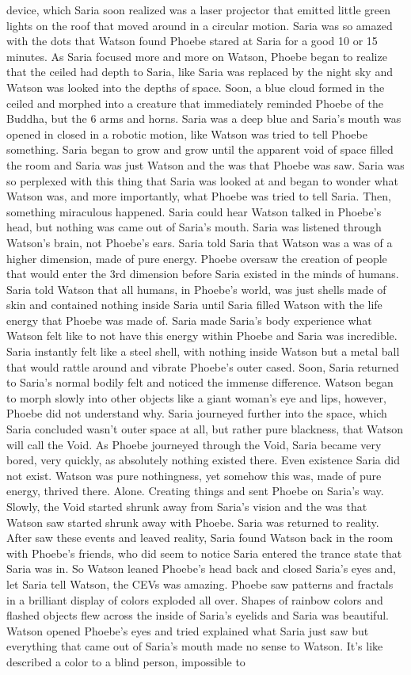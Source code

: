 \documentclass[12pt]{book}
\begin{document}
device, which Saria soon realized was a laser projector that emitted little green lights on the roof that moved around in a circular motion. Saria was so amazed with the dots that Watson found Phoebe stared at Saria for a good 10 or 15 minutes. As Saria focused more and more on Watson, Phoebe began to realize that the ceiled had depth to Saria, like Saria was replaced by the night sky and Watson was looked into the depths of space. Soon, a blue cloud formed in the ceiled and morphed into a creature that immediately reminded Phoebe of the Buddha, but the 6 arms and horns. Saria was a deep blue and Saria's mouth was opened in closed in a robotic motion, like Watson was tried to tell Phoebe something. Saria began to grow and grow until the apparent void of space filled the room and Saria was just Watson and the was that Phoebe was saw. Saria was so perplexed with this thing that Saria was looked at and began to wonder what Watson was, and more importantly, what Phoebe was tried to tell Saria. Then, something miraculous happened. Saria could hear Watson talked in Phoebe's head, but nothing was came out of Saria's mouth. Saria was listened through Watson's brain, not Phoebe's ears. Saria told Saria that Watson was a was of a higher dimension, made of pure energy. Phoebe oversaw the creation of people that would enter the 3rd dimension before Saria existed in the minds of humans. Saria told Watson that all humans, in Phoebe's world, was just shells made of skin and contained nothing inside Saria until Saria filled Watson with the life energy that Phoebe was made of. Saria made Saria's body experience what Watson felt like to not have this energy within Phoebe and Saria was incredible. Saria instantly felt like a steel shell, with nothing inside Watson but a metal ball that would rattle around and vibrate Phoebe's outer cased. Soon, Saria returned to Saria's normal bodily felt and noticed the immense difference. Watson began to morph slowly into other objects like a giant woman's eye and lips, however, Phoebe did not understand why. Saria journeyed further into the space, which Saria concluded wasn't outer space at all, but rather pure blackness, that Watson will call the Void. As Phoebe journeyed through the Void, Saria became very bored, very quickly, as absolutely nothing existed there. Even existence Saria did not exist. Watson was pure nothingness, yet somehow this was, made of pure energy, thrived there. Alone. Creating things and sent Phoebe on Saria's way. Slowly, the Void started shrunk away from Saria's vision and the was that Watson saw started shrunk away with Phoebe. Saria was returned to reality. After saw these events and leaved reality, Saria found Watson back in the room with Phoebe's friends, who did seem to notice Saria entered the trance state that Saria was in. So Watson leaned Phoebe's head back and closed Saria's eyes and, let Saria tell Watson, the CEVs was amazing. Phoebe saw patterns and fractals in a brilliant display of colors exploded all over. Shapes of rainbow colors and flashed objects flew across the inside of Saria's eyelids and Saria was beautiful. Watson opened Phoebe's eyes and tried explained what Saria just saw but everything that came out of Saria's mouth made no sense to Watson. It's like described a color to a blind person, impossible to 
\end{document}
